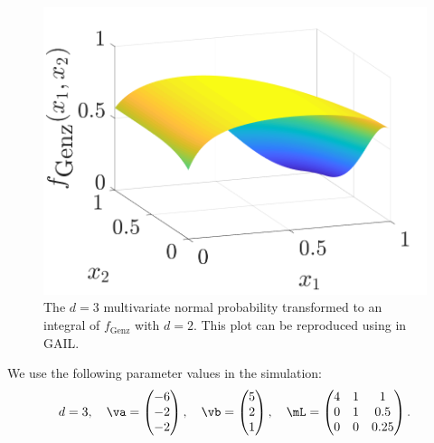 \begin{figure}
	\centering
		\includegraphics[width=0.75\linewidth]{BayesCub/figures/GenzFunc_varTx_none.png}
	\caption{The $d=3$ multivariate normal probability transformed to an integral of $f_{\text{Genz}}$ with  $d=2$. This plot can be reproduced using  in GAIL.}
	\label{fig:MVN_Genz}
\end{figure}

We use the following parameter values in the simulation: 
\begin{equation*}
d = 3, \quad \va = \begin{pmatrix}%
-6 \\ -2 \\ -2
\end{pmatrix}, \quad 
\vb = \begin{pmatrix}%
5 \\ 2 \\ 1
\end{pmatrix} , \quad 
\mL = \begin{pmatrix}%
4 & 1 & 1 \\ 0 & 1 & 0.5 \\ 0 & 0 & 0.25
\end{pmatrix}.
\end{equation*}




